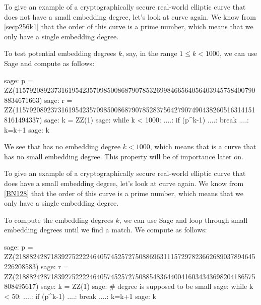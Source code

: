\begin{example}
\label{ex:pairings_on_secp256k1}
 To give an example of a cryptographically secure real-world elliptic curve that does not have a small embedding degree, let's look at curve  again. We know from \examplename{} \ref{secp256k1} that the order of this curve is a prime number, which means that we only have a single embedding degree.

To test potential embedding degrees $k$, say, in the range $1\leq k < 1000$, we can use Sage and compute as follows:
\begin{sagecommandline}
sage: p = ZZ(115792089237316195423570985008687907853269984665640564039457584007908834671663)
sage: r = ZZ(115792089237316195423570985008687907852837564279074904382605163141518161494337)
sage: k = ZZ(1)
sage: while k < 1000:
....:     if (p^k-1)%
....:         break
....:     k=k+1
sage: k
\end{sagecommandline}
We see that  has no embedding degree $k<1000$, which means that   is a curve that has no small embedding degree. This property will be of importance later on.
\end{example}
\begin{example}
\label{ex:embedding_degre_BN128}
To give an example of a cryptographically secure real-world elliptic curve that does have a small embedding degree, let's look at curve  again. We know from \examplename{} \ref{BN128} that the order of this curve is a prime number, which means that we only have a single embedding degree.

To compute the embedding degrees $k$, we can use Sage and loop through small embedding degrees until we find a match. We compute as follows:
\begin{sagecommandline}
sage: p = ZZ(21888242871839275222246405745257275088696311157297823662689037894645226208583)
sage: r = ZZ(21888242871839275222246405745257275088548364400416034343698204186575808495617)
sage: k = ZZ(1)
sage: # degree is supposed to be small
sage: while k < 50: 
....:     if (p^k-1)%
....:         break
....:     k=k+1
sage: k
\end{sagecommandline}
\end{example}



